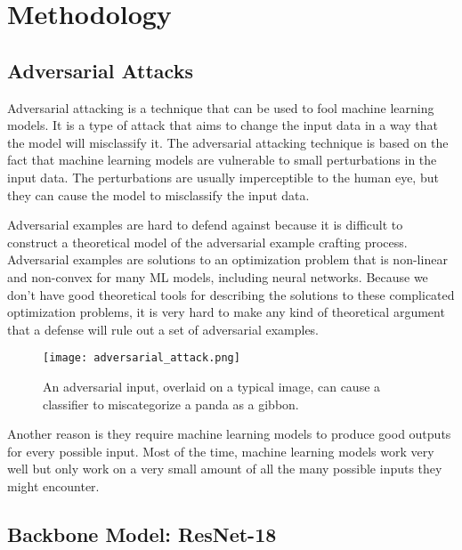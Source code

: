 \section{Methodology}

\subsection{Adversarial Attacks}


Adversarial attacking is a technique that can be used to fool machine learning models. It is a type of attack that aims to change the input data in a way that the model will misclassify it. The adversarial attacking technique is based on the fact that machine learning models are vulnerable to small perturbations in the input data. The perturbations are usually imperceptible to the human eye, but they can cause the model to misclassify the input data.

Adversarial examples are hard to defend against because it is difficult to construct a theoretical model of the adversarial example crafting process. Adversarial examples are solutions to an optimization problem that is non-linear and non-convex for many ML models, including neural networks. Because we don’t have good theoretical tools for describing the solutions to these complicated optimization problems, it is very hard to make any kind of theoretical argument that a defense will rule out a set of adversarial examples.

\begin{figure}[h]
    \centering
    \texttt{[image: adversarial\_attack.png]}
    \caption{An adversarial input, overlaid on a typical image, can cause a classifier to miscategorize a panda as a gibbon.}
    \label{fig:adversarial_attack}
\end{figure}
    

Another reason is they require machine learning models to produce good outputs for every possible input. Most of the time, machine learning models work very well but only work on a very small amount of all the many possible inputs they might encounter. \cite{adversarial_2020}


\subsection{Backbone Model: ResNet-18}


